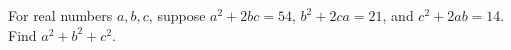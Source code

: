 For real numbers $a,b,c$, suppose $a^2+2bc=54$, $b^2+2ca=21$, and $c^2+2ab=14$. Find $a^2+b^2+c^2$.
